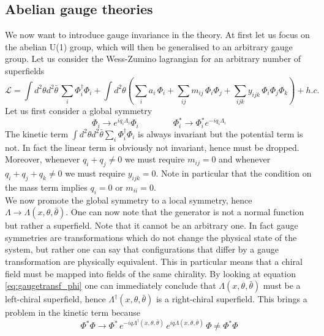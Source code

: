 \documentclass[12pt]{article}
\begin{document}
\subsection{Abelian gauge theories}

We now want to introduce gauge invariance in the theory. At first let us focus on the abelian U(1) group, which will then be generalised to an arbitrary gauge group. 
Let us consider the Wess-Zumino lagrangian for an arbitrary number of superfields
\begin{equation*}
  \mathcal{L} = \int d^2\theta d^2\bar\theta \, \sum_i \Phi_i^\dagger \Phi_i + \int d^2\theta \left( \sum_i a_i \, \Phi_i + \sum_{ij} m_{ij} \, \Phi_i\Phi_j + \sum_{ijk} y_{ijk} \, \Phi_i\Phi_j\Phi_k\right) + h.c.
\end{equation*}
Let us first consider 
a global symmetry
\begin{equation}
  \Phi_i \to e^{iq_i \Lambda_i}\Phi_i \qquad \qquad \Phi^*_i \to \Phi^*_i e^{-iq_i \Lambda_i}
  \label{eq:gaugetransf_phi}
\end{equation}
The kinetic term $\int d^2\theta d^2\bar\theta \sum_i \Phi_i^\dagger \Phi_i$ is always invariant but the potential term is not. In fact the linear term is obviously not invariant, hence must be dropped. 
Moreover, whenever $q_i + q_j \neq 0$ we must require $m_{ij} = 0$ and whenever $q_i + q_j + q_k \neq 0$ we must require $y_{ijk} = 0$. Note in particular that the condition on the mass term implies $q_i = 0$ or $m_{ii} = 0$. \\
We now promote the global symmetry to a local symmetry, hence $\Lambda \to \Lambda(x, \theta, \bar\theta)$. One can now note that the generator is not a normal function but rather a superfield. Note that it cannot be an arbitrary one. 
In fact gauge symmetries are transformations which do not change the physical state of the system, but rather  one can say that configurations that differ by a gauge transformation are physically equivalent. This in particular means that a chiral field must be mapped into fields of the same chirality. 
By looking at equation \ref{eq:gaugetransf_phi} one can immediately conclude that $\Lambda(x, \theta, \bar\theta)$ must be a left-chiral superfield, hence $\Lambda^\dagger(x, \theta, \bar\theta)$ is a right-chiral superfield. This brings a problem in the kinetic term because 
\begin{equation*}
\Phi^* \Phi \to \Phi^* \, e^{-iq\Lambda^\dagger(x,\theta,\bar\theta)} \, e^{iq\Lambda(x,\theta,\bar\theta)} \, \Phi \neq \Phi^* \Phi
\end{equation*}
\end{document}
